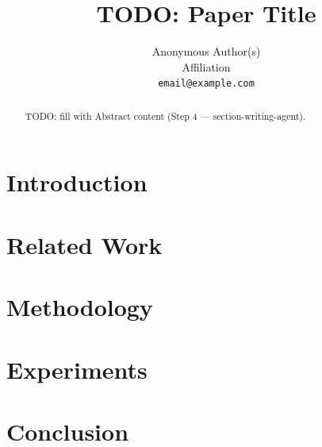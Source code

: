 \documentclass{article}
\title{TODO: Paper Title}
\author{Anonymous Author(s) \\
Affiliation \\
\texttt{email@example.com}}
\begin{document}
\maketitle

\begin{abstract}
TODO: fill with Abstract content (Step 4 — section-writing-agent).
\end{abstract}

\section{Introduction}

\section{Related Work}

\section{Methodology}

\section{Experiments}

\section{Conclusion}

\clearpage


\end{document}
